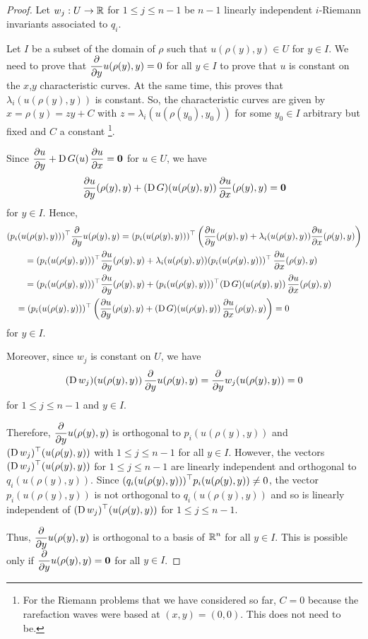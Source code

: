 \begin{proof}
Let $w_j:U \to \RR$ for $1 \leq j \leq n-1$ be $n-1$ linearly
independent $i$-Riemann invariants associated to $q_i$.

Let $I$ be a subset of the domain of $\rho$ such that $u(\rho(y),y) \in U$
for $y \in I$.  We need to prove that
$\DS \pdfdx{u(\rho(y),y)}{y} = 0$ for all $y \in I$
to prove that $u$ is constant on the $x$,$y$ characteristic
curves.  At the same time, this proves that $\lambda_i(u(\rho(y),y))$
is constant.  So, the characteristic curves are given by
$x = \rho(y) = z y + C$ with $z=\lambda_i(u(\rho(y_0),y_0))$ for some
$y_0\in I$ arbitrary but fixed and $C$ a
constant \footnote{For the Riemann problems that we have considered so
far, $C=0$ because the rarefaction waves were based at $(x,y) = (0,0)$.
This does not need to be.}.

Since
$\DS \pdydx{u}{y} + \diff G(u) \, \pdydx{u}{x} = \VEC{0}$
for $u \in U$, we have
\[
  \pdydx{u}{y}(\rho(y),y) + (\diff G)(u(\rho(y),y))
  \, \pdydx{u}{x}(\rho(y),y) = \VEC{0}
\]
for $y \in I$.  Hence,
\begin{align*}
&(p_i(u(\rho(y),y)))^\top \pdfdx{u(\rho(y),y)}{y}
= (p_i(u(\rho(y),y)))^\top \left(\pdydx{u}{y}(\rho(y),y)
+ \lambda_i(u(\rho(y),y)) \pdydx{u}{x}(\rho(y),y)  \right) \\
&\qquad = (p_i(u(\rho(y),y)))^\top \pdydx{u}{y}(\rho(y),y)
+ \lambda_i(u(\rho(y),y)) (p_i(u(\rho(y),y)))^\top \, \pdydx{u}{x}(\rho(y),y) \\
&\qquad = (p_i(u(\rho(y),y)))^\top \pdydx{u}{y}(\rho(y),y)
+ (p_i(u(\rho(y),y)))^\top (\diff G)(u(\rho(y),y)) \, \pdydx{u}{x}(\rho(y),y) \\
&\quad = (p_i(u(\rho(y),y)))^\top  \left( \pdydx{u}{y}(\rho(y),y)
+ (\diff G)(u(\rho(y),y)) \, \pdydx{u}{x}(\rho(y),y) \right) = 0
\end{align*}
for $y \in I$.

Moreover, since $w_j$ is constant on $U$, we have
\[
(\diff w_j)(u(\rho(y),y)) \, \pdfdx{u(\rho(y),y)}{y}
  = \pdfdx{w_j(u(\rho(y),y))}{y} = 0
\]
for $1 \leq j \leq n-1$ and $y \in I$.

Therefore, $\DS \pdfdx{u(\rho(y),y)}{y}$ is orthogonal to
$p_i(u(\rho(y),y))$ and $\DS (\diff w_j)^\top(u(\rho(y),y))$
with $1 \leq j \leq n-1$ for all $y\in I$.  However, the vectors
$\DS (\diff w_j)^\top(u(\rho(y),y))$ for $1\leq j \leq n-1$ are
linearly independent and orthogonal to $q_i(u(\rho(y),y))$.  Since
$\DS (q_i(u(\rho(y),y)))^\top p_i(u(\rho(y),y)) \neq 0$, the vector
$p_i(u(\rho(y),y))$ is not orthogonal to $q_i(u(\rho(y),y))$
and so is linearly independent of
$\DS (\diff w_j)^\top(u(\rho(y),y))$ for $1\leq j \leq n-1$.

Thus, $\DS \pdfdx{u(\rho(y),y)}{y}$ is orthogonal to
a basis of $\DS \RR^n$ for all $y\in I$.  This is possible only if
$\DS \pdfdx{u(\rho(y),y)}{y} = \VEC{0}$
for all $y\in I$.
\end{proof}

